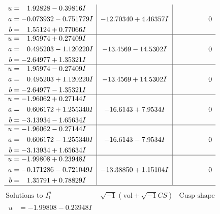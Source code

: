 \documentclass[1p]{elsarticle_modified}
\theoremstyle{definition}
\newcommand{\I}{\sqrt{-1}}
\begin{document}
$$\begin{array}{c|c|c}
\begin{aligned}
u &= \phantom{-}1.92828 - 0.39816 I \\
a &= -0.073932 - 0.751779 I \\
b &= \phantom{-}1.55124 + 0.77066 I\end{aligned}
 & -12.70340 + 4.46357 I & \phantom{-0.000000 } 0 \\ \hline\begin{aligned}
u &= \phantom{-}1.95974 + 0.27409 I \\
a &= \phantom{-}0.495203 - 1.120220 I \\
b &= -2.64977 + 1.35321 I\end{aligned}
 & -13.4569 - 14.5302 I & \phantom{-0.000000 } 0 \\ \hline\begin{aligned}
u &= \phantom{-}1.95974 - 0.27409 I \\
a &= \phantom{-}0.495203 + 1.120220 I \\
b &= -2.64977 - 1.35321 I\end{aligned}
 & -13.4569 + 14.5302 I & \phantom{-0.000000 } 0 \\ \hline\begin{aligned}
u &= -1.96062 + 0.27144 I \\
a &= \phantom{-}0.606172 + 1.255340 I \\
b &= -3.13934 - 1.65634 I\end{aligned}
 & -16.6143 + 7.9534 I & \phantom{-0.000000 } 0 \\ \hline\begin{aligned}
u &= -1.96062 - 0.27144 I \\
a &= \phantom{-}0.606172 - 1.255340 I \\
b &= -3.13934 + 1.65634 I\end{aligned}
 & -16.6143 - 7.9534 I & \phantom{-0.000000 } 0 \\ \hline\begin{aligned}
u &= -1.99808 + 0.23948 I \\
a &= -0.171286 - 0.721049 I \\
b &= \phantom{-}1.35791 + 0.78829 I\end{aligned}
 & -13.38850 + 1.15104 I & \phantom{-0.000000 } 0\\
 \hline 
 \end{array}$$\newpage$$\begin{array}{c|c|c}  
\text{Solutions to }I^u_{1}& \I (\text{vol} + \sqrt{-1}CS) & \text{Cusp shape}\\
 \hline 
\begin{aligned}
u &= -1.99808 - 0.23948 I \\

\end{aligned}
\end{array}$$
\end{document}
